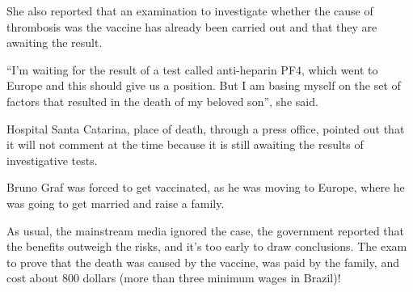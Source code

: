 {She also reported that an examination to investigate whether the cause of
thrombosis was the vaccine has already been carried out and that they are
awaiting the result.

“I’m waiting for the result of a test called anti-heparin PF4, which went to
Europe and this should give us a position. But I am basing myself on the set of
factors that resulted in the death of my beloved son”, she said.

Hospital Santa Catarina, place of death, through a press office, pointed out
that it will not comment at the time because it is still awaiting the results of
investigative tests.

Bruno Graf was forced to get vaccinated, as he was moving to Europe, where he
was going to get married and raise a family.

As usual, the mainstream media ignored the case, the government reported that
the benefits outweigh the risks, and it’s too early to draw conclusions. The
exam to prove that the death was caused by the vaccine, was paid by the family,
and cost about 800 dollars (more than three minimum wages in Brazil)!
  
}
